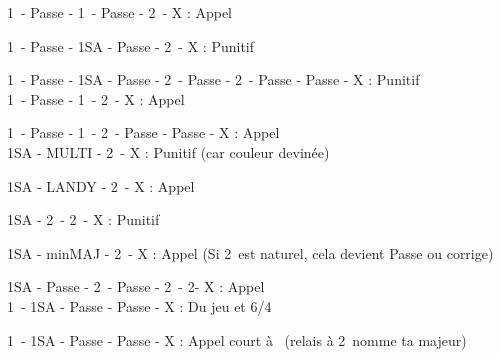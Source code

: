 \documentclass[a4paper, oneside, 11pt]{report}
\begin{document}
		1\coeur\ - Passe - 1\pique\ - Passe - 2\coeur\ - X : Appel
		
		1\coeur\ - Passe - 1SA - Passe - 2\coeur\ - X : Punitif
		
		1\coeur\ - Passe - 1SA - Passe - 2\trefle\ - Passe - 2\coeur\ - Passe - Passe - X : Punitif\\
		
		1\carreau\ - Passe - 1\coeur\ - 2\coeur\ - X : Appel
		
		1\carreau\ - Passe - 1\coeur\ - 2\coeur\ - Passe - Passe - X : Appel\\
		
		1SA - MULTI - 2\coeur\ - X : Punitif (car couleur devinée)
		
		1SA - LANDY - 2\carreau\ - X : Appel
		
		1SA - 2\coeur\ - 2\pique\ - X : Punitif
		
		1SA - minMAJ - 2\trefle\ - X : Appel (Si 2\trefle\ est naturel, cela devient Passe ou corrige)
		
		1SA - Passe - 2\carreau\ - Passe - 2\coeur\ - 2\pique - X : Appel\\
		
		
		
		1\coeur\ - 1SA - Passe - Passe - X : Du jeu et 6\coeur/4\pique
		
		1\trefle\ - 1SA - Passe - Passe - X : Appel court à \carreau\ (relais à 2\carreau\ nomme ta majeur)
\end{document}
